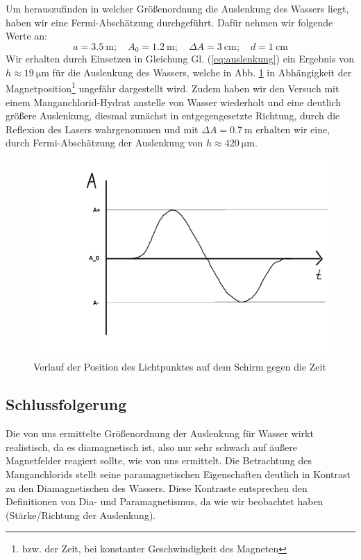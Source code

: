 \documentclass[11pt,a4paper,titlepage, ngerman]{article}
\newcommand{\refeq}[1]{Gl. (\ref{eq:#1})}
\begin{document}
			Um herauszufinden in welcher Größenordnung die Auslenkung des Wassers liegt, haben wir eine Fermi-Abschätzung durchgeführt.
			Dafür nehmen wir folgende Werte an:
			\begin{equation}
				a = \SI{3,5}{\meter};\quad
				A_0 = \SI{1,2}{\meter};\quad
				\Delta A = \SI{3}{\centi\meter};\quad
				d = \SI{1}{\centi\meter}
			\end{equation}
			Wir erhalten durch Einsetzen in Gleichung \refeq{auslenkung} ein Ergebnis von $h \approx \SI{19}{\micro\meter}$ für die Auslenkung des Wassers, welche in Abb. \ref{fig:zeitverlauf} in Abhängigkeit der Magnetposition\footnote{bzw. der Zeit, bei konstanter Geschwindigkeit des Magneten} ungefähr dargestellt wird. Zudem haben wir den Versuch mit einem Manganchlorid-Hydrat anstelle von Wasser wiederholt und eine deutlich größere Auslenkung, diesmal zunächst in entgegengesetzte Richtung, durch die Reflexion des Lasers wahrgenommen und mit $\Delta A = \SI{0,7}{\meter}$ erhalten wir eine, durch Fermi-Abschätzung der Auslenkung von $h \approx \SI{420}{\micro\meter}$.
			
			\begin{figure}[ht]
				\includegraphics[width=\textwidth]{SkizzeZeitverlaufLichtpunktWasser.png}
				\caption{Verlauf der Position des Lichtpunktes auf dem Schirm gegen die Zeit}
				\label{fig:zeitverlauf}
			\end{figure}

		\subsection*{Schlussfolgerung}
								
			Die von uns ermittelte Größenordnung der Auslenkung für Wasser wirkt realistisch, da es diamagnetisch ist, also nur sehr schwach auf äußere Magnetfelder reagiert sollte, wie von uns ermittelt. Die Betrachtung des Manganchlorids stellt seine paramagnetischen Eigenschaften deutlich in Kontrast zu den Diamagnetischen des Wassers. Diese Kontraste entsprechen den Definitionen von Dia- und Paramagnetismus, da wie wir beobachtet haben (Stärke/Richtung der Auslenkung). 
			
\end{document}
